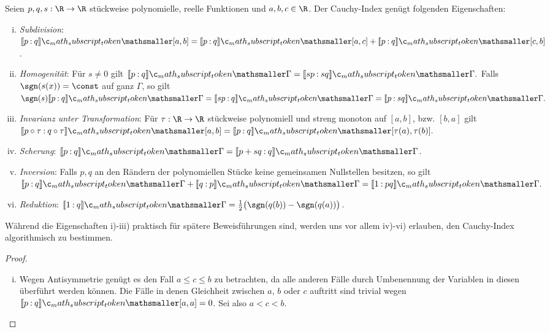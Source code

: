 \documentclass{mythesis}
\begin{document}
\begin{proposition} \label{thm:prop:ci_prop}
    Seien $p, q, s: \R \to \R$ stückweise polynomielle, reelle Funktionen und $a, b, c \in \R$.
    Der Cauchy-Index genügt folgenden Eigenschaften:
    \begin{enumerate}[i)]
        \item
            \emph{Subdivision}: $\Index{[a,b]}{p}{q} = \Index{[a,c]}{p}{q} + \Index{[c,b]}{p}{q}$.
        \item
            \emph{Homogenität}: Für $s \neq 0$ gilt
            \begin{math}
                \Index{\Gamma}{p}{q} = \Index{\Gamma}{sp}{sq}.
            \end{math}
            Falls $\sgn(s(x)) = \const$ auf ganz $\Gamma$, so gilt
            \begin{math}
                \sgn(s) \Index{\Gamma}{p}{q} = \Index{\Gamma}{sp}{q} = \Index{\Gamma}{p}{sq}.
            \end{math}
        \item
            \emph{Invarianz unter Transformation}: Für $\tau: \R \to \R$ stückweise polynomiell und streng monoton auf $[a, b]$, bzw. $[b, a]$ gilt
            \begin{math}[numbered] \label{eq:cauchy-index_transformation}
                \Index{[a,b]}{p\circ\tau }{ q\circ\tau} = \Index{[\tau(a),\tau(b)]}{p}{q}.
            \end{math}
        \item
            \emph{Scherung}: $\Index{\Gamma}{p}{q} = \Index{\Gamma}{p + sq }{ q}$.
        \item
            \emph{Inversion}: Falls $p, q$ an den Rändern der polynomiellen Stücke keine gemeinsamen Nullstellen besitzen, so gilt
            \begin{math}
                \Index{\Gamma}{p}{q} + \Index{\Gamma}{q}{p} = \Index{\Gamma}{1}{pq}.
            \end{math}
        \item
            \emph{Reduktion}: $\Index{\Gamma}{1}{q} = \frac{1}{2}\big(\sgn(q(b)) - \sgn(q(a))\big)$.
    \end{enumerate}
    \begin{note}
        Während die Eigenschaften i)-iii) praktisch für spätere Beweisführungen sind, werden uns vor allem iv)-vi) erlauben, den Cauchy-Index algorithmisch zu bestimmen.
    \end{note}
    \begin{proof}
        \begin{enumerate}[i)]
            \item
                Wegen Antisymmetrie genügt es den Fall $a \le c \le b$ zu betrachten, da alle anderen Fälle durch Umbenennung der Variablen in diesen überführt werden können.
                Die Fälle in denen Gleichheit zwischen $a$, $b$ oder $c$ auftritt sind trivial wegen $\Index{[a,a]}{p}{q} = 0$.
                Sei also $a < c < b$.


\end{enumerate}
\end{proof}
\end{proposition}
\end{document}
